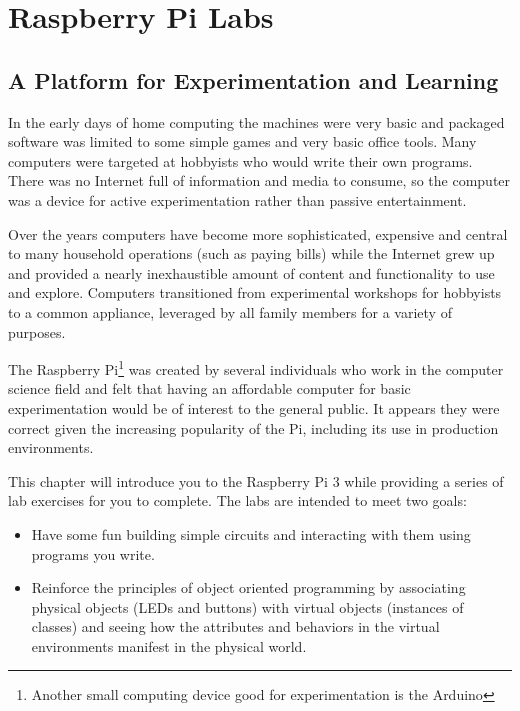 
\chapter{Raspberry Pi Labs}


\section{A Platform for Experimentation and Learning}


In the early days of home computing the machines were very basic and packaged software was limited to 
some simple games and very basic office tools. Many computers were targeted at hobbyists who would 
write their own programs. There was no Internet full of information and media to consume,
so the computer was a device for active experimentation rather than passive entertainment.

Over the years computers have become more sophisticated, expensive and central to many household operations
(such as paying bills) while the Internet grew up and provided a nearly inexhaustible amount
of content and functionality to use and explore. Computers transitioned from experimental
workshops for hobbyists to a common appliance, leveraged by all family members for a variety
of purposes.

The Raspberry Pi\footnote{Another small computing device good for experimentation is the Arduino} was created
by several individuals who work in the computer science field and felt that having an affordable
computer for basic experimentation would be of interest to the general public. It appears they were correct
given the increasing popularity of the Pi, including its use in production environments.

This chapter will introduce you to the Raspberry Pi 3 while providing a series of lab exercises for you
to complete. The labs are intended to meet two goals: 

\begin{itemize}
	
\item Have some fun building simple circuits and interacting with them using programs you write.

\item Reinforce the principles of object oriented programming by associating physical objects (LEDs and buttons)
with virtual objects (instances of classes) and seeing how the attributes and behaviors in the
virtual environments manifest in the physical world.

\end{itemize}

